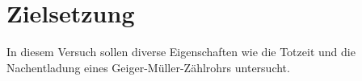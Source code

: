 \section{Zielsetzung}

\label{sec:Zielsetzung}
In diesem Versuch sollen diverse Eigenschaften wie die Totzeit und
die Nachentladung eines Geiger-Müller-Zählrohrs untersucht.
